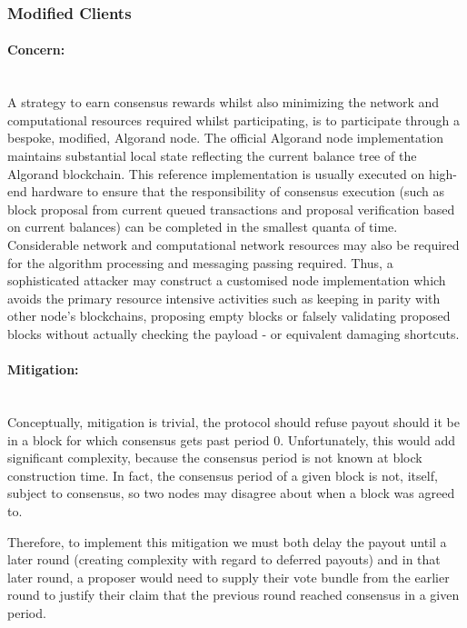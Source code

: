 \documentclass[11pt,a4paper]{article}
\begin{document}
\pagebreak

\subsubsection{Modified Clients}

\paragraph{Concern:} \mbox{}\\
A strategy to earn consensus rewards whilst also minimizing the network and computational resources required whilst 
participating, is to participate through a bespoke, modified, Algorand node. The official Algorand node implementation 
maintains substantial local state reflecting the current balance tree of the Algorand blockchain. This reference 
implementation is usually executed on high-end hardware to ensure that the responsibility of consensus execution (such 
as block proposal from current queued transactions and proposal verification based on current balances) can be completed 
in the smallest quanta of time. Considerable network and computational network resources may also be required for the 
algorithm processing and messaging passing required. Thus, a sophisticated attacker may construct a customised node 
implementation which avoids the primary resource intensive activities such as keeping in parity with other node's 
blockchains, proposing empty blocks or falsely validating proposed blocks without actually checking the payload - or 
equivalent damaging shortcuts. 

\paragraph{Mitigation:} \mbox{}\\
Conceptually, mitigation is trivial, the protocol should refuse payout should it be in a block for which consensus gets 
past period 0. Unfortunately, this would add significant complexity, because the consensus period is not known at block 
construction time. In fact, the consensus period of a given block is not, itself, subject to consensus, so two nodes may 
disagree about when a block was agreed to.

Therefore, to implement this mitigation we must both delay the payout until a later round (creating complexity with 
regard to deferred payouts) and in that later round, a proposer would need to supply their vote bundle from the earlier 
round to justify their claim that the previous round reached consensus in a given period.
\end{document}
